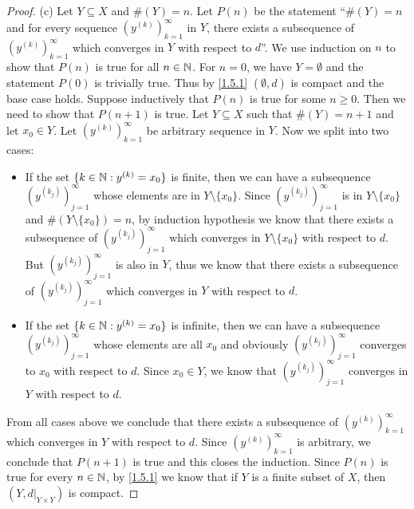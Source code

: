 \begin{proof}{(c)}
  Let \(Y \subseteq X\) and \(\#(Y) = n\).
  Let \(P(n)\) be the statement ``\(\#(Y) = n\) and for every sequence \((y^{(k)})_{k = 1}^\infty\) in \(Y\), there exists a subsequence of \((y^{(k)})_{k = 1}^\infty\) which converges in \(Y\) with respect to \(d\)''.
  We use induction on \(n\) to show that \(P(n)\) is true for all \(n \in \mathbb{N}\).
  For \(n = 0\), we have \(Y = \emptyset\) and the statement \(P(0)\) is trivially true.
  Thus by \cref{1.5.1} \((\emptyset, d)\) is compact and the base case holds.
  Suppose inductively that \(P(n)\) is true for some \(n \geq 0\).
  Then we need to show that \(P(n + 1)\) is true.
  Let \(Y \subseteq X\) such that \(\#(Y) = n + 1\) and let \(x_0 \in Y\).
  Let \((y^{(k)})_{k = 1}^\infty\) be arbitrary sequence in \(Y\).
  Now we split into two cases:
  \begin{itemize}
    \item If the set \(\{k \in \mathbb{N} : y^{(k)} = x_0\}\) is finite, then we can have a subsequence \((y^{(k_j)})_{j = 1}^\infty\) whose elements are in \(Y \setminus \{x_0\}\).
          Since \((y^{(k_j)})_{j = 1}^\infty\) is in \(Y \setminus \{x_0\}\) and \(\#(Y \setminus \{x_0\}) = n\), by induction hypothesis we know that there exists a subsequence of \((y^{(k_j)})_{j = 1}^\infty\) which converges in \(Y \setminus \{x_0\}\) with respect to \(d\).
          But \((y^{(k_j)})_{j = 1}^\infty\) is also in \(Y\), thus we know that there exists a subsequence of \((y^{(k_j)})_{j = 1}^\infty\) which converges in \(Y\) with respect to \(d\).
    \item If the set \(\{k \in \mathbb{N} : y^{(k)} = x_0\}\) is infinite, then we can have a subsequence \((y^{(k_j)})_{j = 1}^\infty\) whose elements are all \(x_0\) and obviously \((y^{(k_j)})_{j = 1}^\infty\) converges to \(x_0\) with respect to \(d\).
          Since \(x_0 \in Y\), we know that \((y^{(k_j)})_{j = 1}^\infty\) converges in \(Y\) with respect to \(d\).
  \end{itemize}
  From all cases above we conclude that there exists a subsequence of \((y^{(k)})_{k = 1}^\infty\) which converges in \(Y\) with respect to \(d\).
  Since \((y^{(k)})_{k = 1}^\infty\) is arbitrary, we conclude that \(P(n + 1)\) is true and this closes the induction.
  Since \(P(n)\) is true for every \(n \in \mathbb{N}\), by \cref{1.5.1} we know that if \(Y\) is a finite subset of \(X\), then \((Y, d|_{Y \times Y})\) is compact.
\end{proof}

\exercisesection

